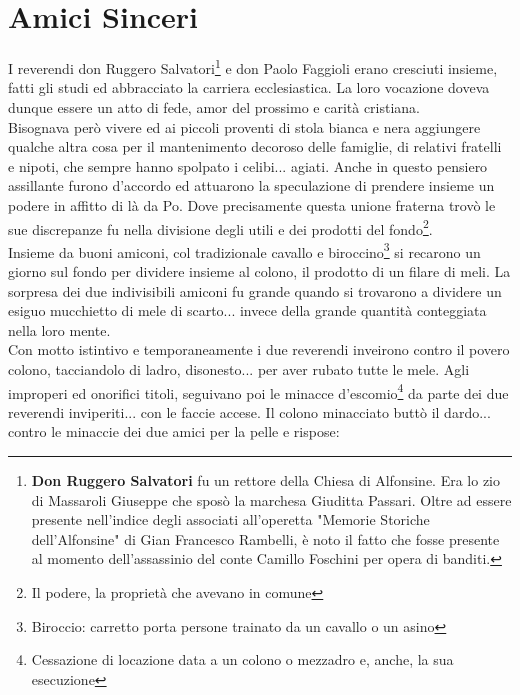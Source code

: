 
\chapter{Amici Sinceri}
I reverendi don Ruggero Salvatori\footnote{\textbf{Don Ruggero Salvatori} fu un rettore della Chiesa di Alfonsine. Era lo zio di Massaroli Giuseppe che sposò la marchesa Giuditta Passari. Oltre ad essere presente nell'indice degli associati all'operetta "Memorie Storiche dell'Alfonsine" di Gian Francesco Rambelli, è noto il fatto che fosse presente al momento dell'assassinio del conte Camillo Foschini per opera di banditi.} e don Paolo Faggioli erano cresciuti insieme, fatti gli studi ed abbracciato la carriera ecclesiastica. La loro vocazione doveva dunque essere un atto di fede, amor del prossimo e carità cristiana.\\
\indent Bisognava però vivere ed ai piccoli proventi di stola bianca e nera aggiungere qualche altra cosa per il mantenimento decoroso delle famiglie, di relativi fratelli e nipoti, che sempre hanno spolpato i celibi... agiati. Anche in questo pensiero assillante furono d'accordo ed attuarono la speculazione di prendere insieme un podere in affitto di là da Po. Dove precisamente questa unione fraterna trovò le sue discrepanze fu nella divisione degli utili e dei prodotti del fondo\footnote{Il podere, la proprietà che avevano in comune}. \\
\indent Insieme da buoni amiconi, col tradizionale cavallo e biroccino\footnote{Biroccio: carretto porta persone trainato da un cavallo o un asino} si recarono un giorno sul fondo per dividere insieme al colono, il prodotto di un filare di meli. La sorpresa dei due indivisibili amiconi fu grande quando si trovarono a dividere un esiguo mucchietto di mele di scarto... invece della grande quantità conteggiata nella loro mente. \\
\indent Con motto istintivo e temporaneamente i due reverendi inveirono contro il povero colono, tacciandolo di ladro, disonesto... per aver rubato tutte le mele. Agli improperi ed onorifici titoli, seguivano poi le minacce d'escomio\footnote{Cessazione di locazione data a un colono o mezzadro e, anche, la sua esecuzione} da parte dei due reverendi inviperiti... con le faccie accese. Il colono minacciato buttò il dardo... contro le minaccie dei due amici per la pelle e rispose: \\
